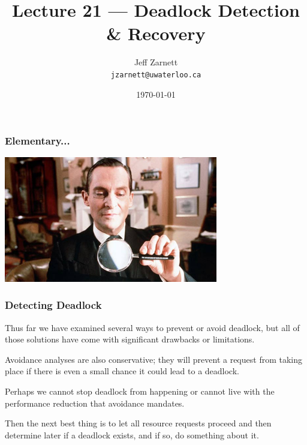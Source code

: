 

\title{Lecture 21 --- Deadlock Detection \& Recovery }

\author{Jeff Zarnett \\ \small \texttt{jzarnett@uwaterloo.ca}}
\date{\today}




\begin{frame}
	\titlepage

\end{frame}


\begin{frame}
	\frametitle{Elementary...}

	\begin{center}
		\includegraphics[width=0.7\textwidth]{images/jeremy-brett.jpg}
	\end{center}

\end{frame}


\begin{frame}
	\frametitle{Detecting Deadlock}

	Thus far we have examined several ways to prevent or avoid deadlock, but all of those solutions have come with significant drawbacks or limitations.

	Avoidance analyses are also conservative; they will prevent a request from taking place if there is even a small chance it could lead to a deadlock.

	Perhaps we cannot stop deadlock from happening or cannot live with the performance reduction that avoidance mandates.

	Then the next best thing is to let all resource requests proceed and then determine later if a deadlock exists, and if so, do something about it.

\end{frame}


